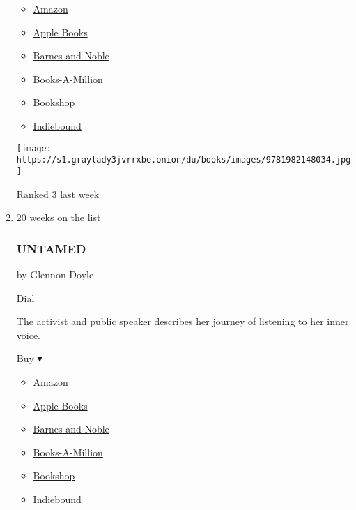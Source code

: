 \begin{enumerate}
  \begin{itemize}
  \tightlist
  \item
    \href{https://www.amazon.com/dp/1982148039?tag=NYTBSREV-20\&tag=NYTBS-20}{Amazon}
  \item
    \href{https://du-gae-books-dot-nyt-du-prd.appspot.com/buy?title=THE+ROOM+WHERE+IT+HAPPENED\&author=John+Bolton}{Apple
    Books}
  \item
    \href{https://www.anrdoezrs.net/click-7990613-11819508?url=https\%3A\%2F\%2Fwww.barnesandnoble.com\%2Fw\%2F\%3Fean\%3D9781982148034}{Barnes
    and Noble}
  \item
    \href{https://www.anrdoezrs.net/click-7990613-35140?url=https\%3A\%2F\%2Fwww.booksamillion.com\%2Fp\%2FTHE\%2BROOM\%2BWHERE\%2BIT\%2BHAPPENED\%2FJohn\%2BBolton\%2F9781982148034}{Books-A-Million}
  \item
    \href{https://bookshop.org/a/3546/9781982148034}{Bookshop}
  \item
    \href{https://www.indiebound.org/book/9781982148034?aff=NYT}{Indiebound}
  \end{itemize}

  \texttt{[image: https://s1.graylady3jvrrxbe.onion/du/books/images/9781982148034.jpg]}

  Ranked 3 last week
\item
  20 weeks on the list

  \hypertarget{untamed}{%
  \subsubsection{UNTAMED}\label{untamed}}

  by Glennon Doyle

  Dial

  The activist and public speaker describes her journey of listening to
  her inner voice.

  Buy ▾

  \begin{itemize}
  \tightlist
  \item
    \href{https://www.amazon.com/dp/1984801252?tag=NYTBSREV-20\&tag=NYTBS-20}{Amazon}
  \item
    \href{https://du-gae-books-dot-nyt-du-prd.appspot.com/buy?title=UNTAMED\&author=Glennon+Doyle}{Apple
    Books}
  \item
    \href{https://www.anrdoezrs.net/click-7990613-11819508?url=https\%3A\%2F\%2Fwww.barnesandnoble.com\%2Fw\%2F\%3Fean\%3D9781984801258}{Barnes
    and Noble}
  \item
    \href{https://www.anrdoezrs.net/click-7990613-35140?url=https\%3A\%2F\%2Fwww.booksamillion.com\%2Fp\%2FUNTAMED\%2FGlennon\%2BDoyle\%2F9781984801258}{Books-A-Million}
  \item
    \href{https://bookshop.org/a/3546/9781984801258}{Bookshop}
  \item
    \href{https://www.indiebound.org/book/9781984801258?aff=NYT}{Indiebound}
  \end{itemize}


\end{enumerate}
